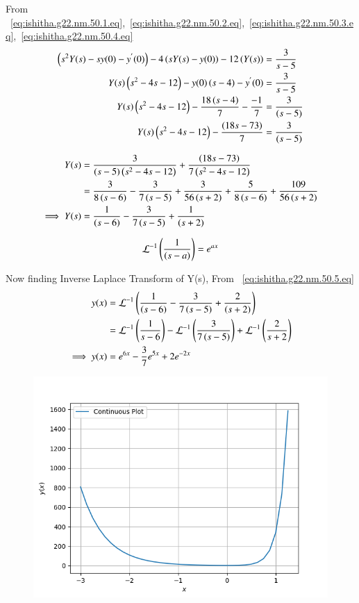 \documentclass[journal,12pt,onecolumn]{IEEEtran}
\theoremstyle{remark}
\begin{document}
From ~\eqref{eq:ishitha.g22.nm.50.1.eq},~\eqref{eq:ishitha.g22.nm.50.2.eq},~\eqref{eq:ishitha.g22.nm.50.3.eq},~\eqref{eq:ishitha.g22.nm.50.4.eq}
\begin{align}
\left(s^{2}Y(s)-sy(0)-y^{'}(0)\right) - 4\left(sY(s)-y(0)\right)- 12\left(Y(s)\right) &= \frac{3}{s-5} \\
Y(s)\left(s^{2}-4s-12\right) -y(0)\left(s-4\right) -y^{'}(0) &= \frac{3}{s-5} \\
Y(s)\left(s^{2}-4s-12\right) - \frac{18\left(s-4\right)}{7} -\frac{-1}{7} &= \frac{3}{(s-5)} \\
Y(s)\left(s^{2}-4s-12\right) - \frac{\left(18s -73 \right)}{7}  &= \frac{3}{(s-5)} 
\end{align}

\begin{align}
Y(s) &= \frac{3}{(s-5)\left(s^{2}-4s-12\right)} + \frac{\left(18s -73 \right)}{7\left(s^{2}-4s-12\right) } \\
&= \frac{3}{8\left(s-6\right)} -\frac{3}{7\left(s-5\right)} +\frac{3}{56\left(s+2\right)} +\frac{5}{8\left(s-6\right)} +\frac{109}{56\left(s+2\right)}  \\
\implies Y(s)&= \frac{1}{\left(s-6\right)} -\frac{3}{7\left(s-5\right)} + \frac{1}{\left(s+2\right)} 
\end{align}

\begin{equation}
\mathcal{L}^{-1}\left(\frac{1}{\left(s-a\right)}\right) = e^{ax} \\ \label{eq:ishitha.g22.nm.50.5.eq}
\end{equation}

Now finding Inverse Laplace Transform of Y(s),
From ~\eqref{eq:ishitha.g22.nm.50.5.eq}
\begin{align}
y(x)&=\mathcal{L}^{-1}\left(\frac{1}{\left(s-6\right)} -\frac{3}{7\left(s-5\right)} + \frac{2}{\left(s+2\right)} \right) \\
&= \mathcal{L}^{-1}\left(\frac{1}{s-6}\right) - \mathcal{L}^{-1}\left(\frac{3}{7\left(s-5\right)}\right) +\mathcal{L}^{-1}\left(\frac{2}{s+2}\right) \\
\implies y(x) &= e^{6x} -\frac{3}{7}e^{5x} + 2e^{-2x}
\end{align}

\begin{figure}[!ht]
    \centering
     \includegraphics[width=\columnwidth]{./figs/g50fig1.png}
    \caption{}    
    \label{fig:ishitha.g22.nm.50.f2}
\end{figure}
\end{document}
